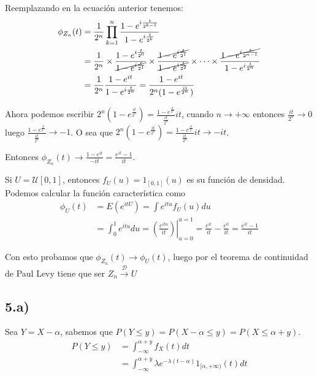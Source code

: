 \documentclass[a4paper,10pt]{article}
\begin{document}
Reemplazando en la ecuación anterior tenemos:
\[
\begin{align*}
\phi_{Z_n}(t) &= \frac{1}{2^n} \prod_{k=1}^n \frac{1 - e^{i\frac{t}{2^{k-1}}}}{1 - e^{i\frac{t}{2^k}}} \\
&= \frac{1}{2^n} \times \frac{1 - e^{i\frac{t}{2^{0}}}}{\cancel{1 - e^{i\frac{t}{2^{1}}}}}
\times \frac{\cancel{1 - e^{i\frac{t}{2^{1}}}}}{\cancel{1 - e^{i\frac{t}{2^{2}}}}} \times \cdots
\times \frac{\cancel{1 - e^{i\frac{t}{2^{n-1}}}}}{1 - e^{i\frac{t}{2^{n}}}} \\
&= \frac{1}{2^n} \frac{1 - e^{it}}{1 - e^{i\frac{t}{2^{n}}}} = \frac{1 - e^{it}}{2^n (1 - e^{\frac{it}{2^{n}}})}
\end{align*}
\]

Ahora podemos escribir $2^n (1 - e^{\frac{it}{2^{n}}}) = \frac{1 - e^{\frac{it}{2^{n}}}}{\frac{it}{2^n}}it$,
cuando $n \rightarrow +\infty$ entonces $\frac{it}{2^n} \rightarrow 0$ luego 
$\frac{1 - e^{\frac{it}{2^{n}}}}{\frac{it}{2^n}} \rightarrow -1$. O sea que 
$2^n (1 - e^{\frac{it}{2^{n}}}) = \frac{1 - e^{\frac{it}{2^{n}}}}{\frac{it}{2^n}}it \rightarrow -it$.

Entonces $\phi_{Z_n}(t) \rightarrow \frac{1 - e^{it}}{-it} = \frac{e^{it} - 1}{it}$.

Si $U = \mathcal U[0, 1]$, entonces $f_U(u) = 1_{[0, 1]}(u)$ es su función de densidad.
Podemos calcular la función característica como
\[
\begin{align*}
\phi_U(t) &= E(e^{itU}) = \int e^{itu} f_U(u) du \\
&= \int_0^1 e^{itu} du = \left.\left(\frac{e^{itu}}{it}\right)\right|_{u=0}^{u=1}
= \frac{e^{it}}{it} - \frac{e^{0}}{it} = \frac{e^{it} - 1}{it}
\end{align*}
\]

Con esto probamos que $\phi_{Z_n}(t) \rightarrow \phi_U(t)$, luego por el teorema de
continuidad de Paul Levy tiene que ser $Z_n \overset{\mathcal D}{\rightarrow} U$

\subsection*{5.a)}

Sea $Y=X-\alpha$, sabemos que $P(Y \le y) = P(X - \alpha \le y) = P(X \le \alpha + y)$.
\[
\begin{align*}
P(Y \le y) &= \int_{-\infty}^{\alpha + y} f_X(t) dt \\
&= \int_{-\infty}^{\alpha + y} \lambda e^{-\lambda(t-\alpha)} 1_{[\alpha, +\infty)}(t) dt
\end{align*}
\]
\end{document}
